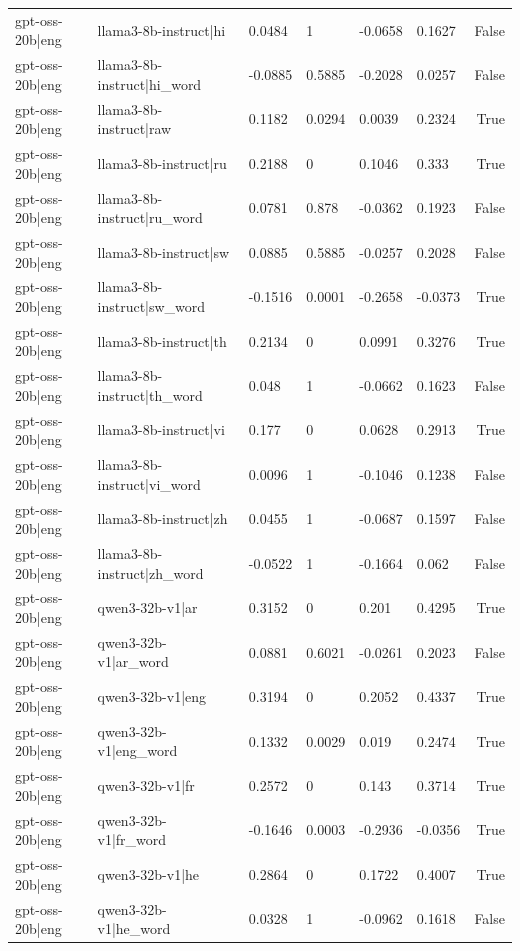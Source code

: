 \begin{table}
\begin{tabular}{llllllr}
gpt-oss-20b|eng & llama3-8b-instruct|hi & 0.0484 & 1 & -0.0658 & 0.1627 & False \\
gpt-oss-20b|eng & llama3-8b-instruct|hi_word & -0.0885 & 0.5885 & -0.2028 & 0.0257 & False \\
gpt-oss-20b|eng & llama3-8b-instruct|raw & 0.1182 & 0.0294 & 0.0039 & 0.2324 & True \\
gpt-oss-20b|eng & llama3-8b-instruct|ru & 0.2188 & 0 & 0.1046 & 0.333 & True \\
gpt-oss-20b|eng & llama3-8b-instruct|ru_word & 0.0781 & 0.878 & -0.0362 & 0.1923 & False \\
gpt-oss-20b|eng & llama3-8b-instruct|sw & 0.0885 & 0.5885 & -0.0257 & 0.2028 & False \\
gpt-oss-20b|eng & llama3-8b-instruct|sw_word & -0.1516 & 0.0001 & -0.2658 & -0.0373 & True \\
gpt-oss-20b|eng & llama3-8b-instruct|th & 0.2134 & 0 & 0.0991 & 0.3276 & True \\
gpt-oss-20b|eng & llama3-8b-instruct|th_word & 0.048 & 1 & -0.0662 & 0.1623 & False \\
gpt-oss-20b|eng & llama3-8b-instruct|vi & 0.177 & 0 & 0.0628 & 0.2913 & True \\
gpt-oss-20b|eng & llama3-8b-instruct|vi_word & 0.0096 & 1 & -0.1046 & 0.1238 & False \\
gpt-oss-20b|eng & llama3-8b-instruct|zh & 0.0455 & 1 & -0.0687 & 0.1597 & False \\
gpt-oss-20b|eng & llama3-8b-instruct|zh_word & -0.0522 & 1 & -0.1664 & 0.062 & False \\
gpt-oss-20b|eng & qwen3-32b-v1|ar & 0.3152 & 0 & 0.201 & 0.4295 & True \\
gpt-oss-20b|eng & qwen3-32b-v1|ar_word & 0.0881 & 0.6021 & -0.0261 & 0.2023 & False \\
gpt-oss-20b|eng & qwen3-32b-v1|eng & 0.3194 & 0 & 0.2052 & 0.4337 & True \\
gpt-oss-20b|eng & qwen3-32b-v1|eng_word & 0.1332 & 0.0029 & 0.019 & 0.2474 & True \\
gpt-oss-20b|eng & qwen3-32b-v1|fr & 0.2572 & 0 & 0.143 & 0.3714 & True \\
gpt-oss-20b|eng & qwen3-32b-v1|fr_word & -0.1646 & 0.0003 & -0.2936 & -0.0356 & True \\
gpt-oss-20b|eng & qwen3-32b-v1|he & 0.2864 & 0 & 0.1722 & 0.4007 & True \\
gpt-oss-20b|eng & qwen3-32b-v1|he_word & 0.0328 & 1 & -0.0962 & 0.1618 & False \\

\end{tabular}
\end{table}
